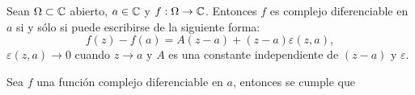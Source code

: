 \begin{teor}\label{teodif}
	Sean $\Omega\subset \mathbb{C}$ abierto, $a\in\mathbb{C}$ y $f:\Omega\rightarrow\mathbb{C}$. Entonces $f$ es complejo diferenciable en $a$ si y sólo si puede escribirse de la siguiente forma:
	\begin{equation}
		f(z)-f(a)=A(z-a)+(z-a)\varepsilon(z,a),
	\end{equation}
	 $\varepsilon(z,a)\rightarrow 0$ cuando $z\rightarrow a$ y $A$ es una constante independiente de $(z-a)$ y $\varepsilon$.
	
\end{teor}

Sea $f$ una función complejo diferenciable en $a$, entonces se cumple que
